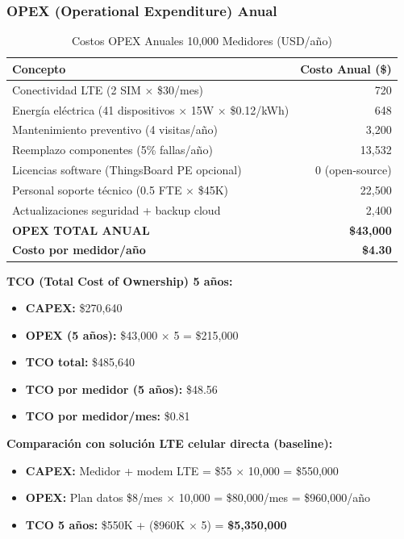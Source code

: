 \subsubsection{OPEX (Operational Expenditure) Anual}

\begin{table}[h]
\centering
\caption{Costos OPEX Anuales 10,000 Medidores (USD/año)}
\label{tab:opex-10k}
\begin{tabular}{|l|r|}
\hline
\textbf{Concepto} & \textbf{Costo Anual (\$)} \\
\hline
Conectividad LTE (2 SIM $\times$ \$30/mes) & 720 \\
\hline
Energía eléctrica (41 dispositivos $\times$ 15W $\times$ \$0.12/kWh) & 648 \\
\hline
Mantenimiento preventivo (4 visitas/año) & 3,200 \\
\hline
Reemplazo componentes (5\% fallas/año) & 13,532 \\
\hline
Licencias software (ThingsBoard PE opcional) & 0 (open-source) \\
\hline
Personal soporte técnico (0.5 FTE $\times$ \$45K) & 22,500 \\
\hline
Actualizaciones seguridad + backup cloud & 2,400 \\
\hline
\hline
\textbf{OPEX TOTAL ANUAL} & \textbf{\$43,000} \\
\hline
\textbf{Costo por medidor/año} & \textbf{\$4.30} \\
\hline
\end{tabular}
\end{table}

\textbf{TCO (Total Cost of Ownership) 5 años:}
\begin{itemize}
\item \textbf{CAPEX:} \$270,640
\item \textbf{OPEX (5 años):} \$43,000 $\times$ 5 = \$215,000
\item \textbf{TCO total:} \$485,640
\item \textbf{TCO por medidor (5 años):} \$48.56
\item \textbf{TCO por medidor/mes:} \$0.81
\end{itemize}

\textbf{Comparación con solución LTE celular directa (baseline):}
\begin{itemize}
\item \textbf{CAPEX:} Medidor + modem LTE = \$55 $\times$ 10,000 = \$550,000
\item \textbf{OPEX:} Plan datos \$8/mes $\times$ 10,000 = \$80,000/mes = \$960,000/año
\item \textbf{TCO 5 años:} \$550K + (\$960K $\times$ 5) = \textbf{\$5,350,000}
\end{itemize}

